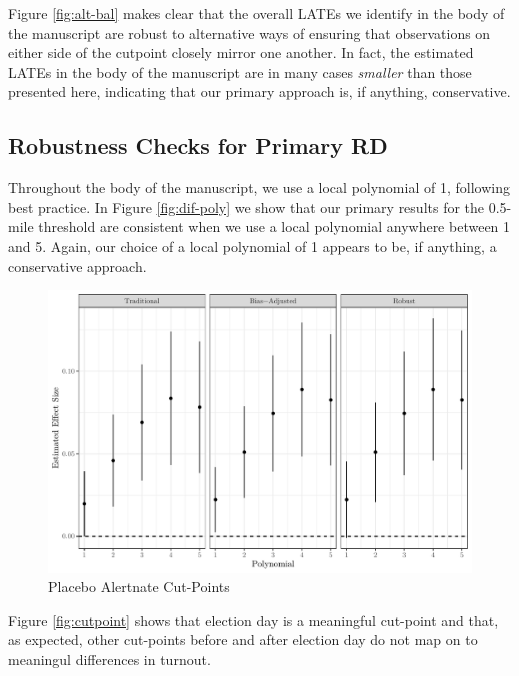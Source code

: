 \documentclass[
  12pt,
]{article}
\begin{document}
Figure \ref{fig:alt-bal} makes clear that the overall LATEs we identify in the body of the manuscript are robust to alternative ways of ensuring that observations on either side of the cutpoint closely mirror one another. In fact, the estimated LATEs in the body of the manuscript are in many cases \emph{smaller} than those presented here, indicating that our primary approach is, if anything, conservative.

\hypertarget{robustness-checks-for-primary-rd}{%
\subsection*{Robustness Checks for Primary RD}\label{robustness-checks-for-primary-rd}}

Throughout the body of the manuscript, we use a local polynomial of 1, following best practice. In Figure \ref{fig:dif-poly} we show that our primary results for the 0.5-mile threshold are consistent when we use a local polynomial anywhere between 1 and 5. Again, our choice of a local polynomial of 1 appears to be, if anything, a conservative approach.

\begin{figure}[!ht]

{\centering \includegraphics{si_files/figure-latex/diff-poly-1} 

}

\caption{\label{fig:dif-poly}Placebo Alertnate Cut-Points}\label{fig:diff-poly}
\end{figure}

Figure \ref{fig:cutpoint} shows that election day is a meaningful cut-point and that, as expected, other cut-points before and after election day do not map on to meaningul differences in turnout.
\end{document}
